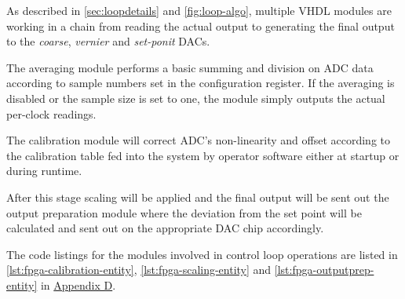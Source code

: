 As described in \autoref{sec:loopdetails} and \autoref{fig:loop-algo},
multiple VHDL modules are working in a chain from reading the actual output
to generating the final output to the \emph{coarse}, \emph{vernier} and
\emph{set-ponit} DACs.

The averaging module performs a basic summing and division on ADC data
according to sample numbers set in the configuration register.
If the averaging is disabled or the sample size is set to one, the module
simply outputs the actual per-clock readings.

The calibration module will correct ADC's non-linearity and offset according
to the calibration table fed into the system by operator software
either at startup or during runtime.

After this stage scaling will be applied and the final output will be
sent out the output preparation module where the deviation from the set point
will be calculated and sent out on the appropriate DAC chip accordingly.

The code listings for the modules involved in control loop operations are
listed in \autoref{lst:fpga-calibration-entity},
\autoref{lst:fpga-scaling-entity} and \autoref{lst:fpga-outputprep-entity}
in \hyperref[sec:hvs-fpga-compensation-vhdl]{Appendix D}.









